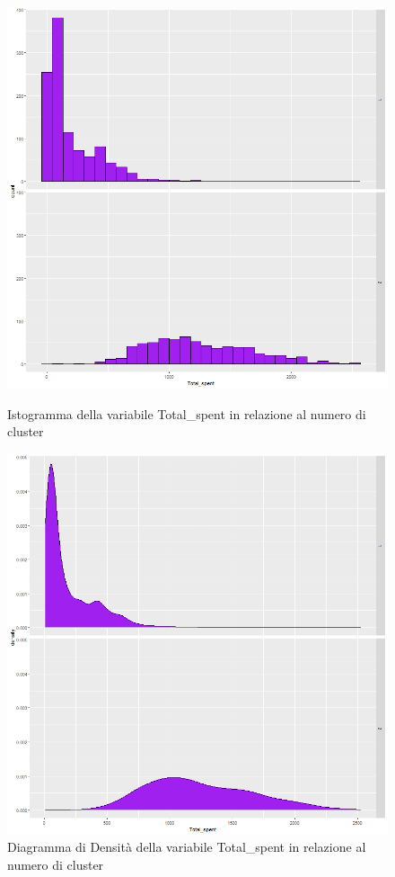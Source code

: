 \documentclass[letterpaper,11pt]{article}
\begin{document}
\begin{figure}[!htb]
   \begin{minipage}{0.48\textwidth}
     \centering
         \includegraphics[width=1\textwidth]{Img/K-MEANS/KMEANS013.png}
    \caption{Istogramma della variabile Total\_spent in relazione al numero di cluster}
    \label{fig:TotalSpentKmeansHistogram}
   \end{minipage}\hfill
   \begin{minipage}{0.48\textwidth}
     \centering
     \includegraphics[width=1\linewidth]{Img/K-MEANS/KMEANS014.png}
     \caption{Diagramma di Densità della variabile Total\_spent in relazione al numero di cluster}\label{fig:TotalSpentKmeansDensity}
   \end{minipage}
\end{figure}
\end{document}
